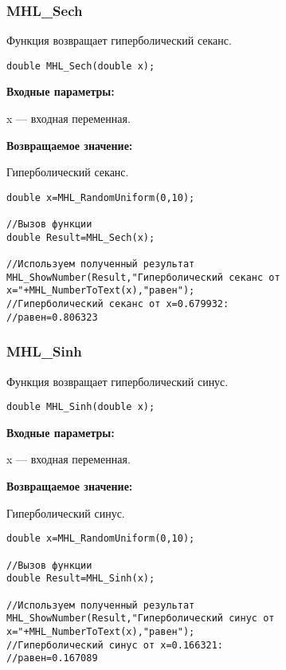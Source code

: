 \documentclass[a4paper,12pt]{article}
\begin{document}
\subsubsection{MHL\_Sech}\label{MHL_Sech}

Функция возвращает гиперболический секанс.


\begin{lstlisting}[label=code_syntax_MHL_Sech,caption=Синтаксис]
double MHL_Sech(double x);
\end{lstlisting}

\textbf{Входные параметры:}

 x --- входная переменная.

\textbf{Возвращаемое значение:}

Гиперболический секанс.


\begin{lstlisting}[label=code_use_MHL_Sech,caption=Пример использования]
double x=MHL_RandomUniform(0,10);

//Вызов функции
double Result=MHL_Sech(x);

//Используем полученный результат
MHL_ShowNumber(Result,"Гиперболический секанс от x="+MHL_NumberToText(x),"равен");
//Гиперболический секанс от x=0.679932:
//равен=0.806323
\end{lstlisting}

\subsubsection{MHL\_Sinh}\label{MHL_Sinh}

Функция возвращает гиперболический синус.


\begin{lstlisting}[label=code_syntax_MHL_Sinh,caption=Синтаксис]
double MHL_Sinh(double x);
\end{lstlisting}

\textbf{Входные параметры:}

 x --- входная переменная.

\textbf{Возвращаемое значение:}

Гиперболический синус.


\begin{lstlisting}[label=code_use_MHL_Sinh,caption=Пример использования]
double x=MHL_RandomUniform(0,10);

//Вызов функции
double Result=MHL_Sinh(x);

//Используем полученный результат
MHL_ShowNumber(Result,"Гиперболический синус от x="+MHL_NumberToText(x),"равен");
//Гиперболический синус от x=0.166321:
//равен=0.167089
\end{lstlisting}
\end{document}
